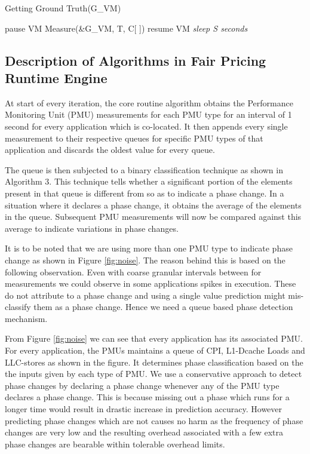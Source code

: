 \documentclass[pageno]{jpaper}
\begin{document}
\begin{algorithm}
\caption{Getting Ground Truth(G\_VM)}
\begin{algorithmic}[1]
\label{alg:groundtruth}
	\State	pause VM\;
	\EndIf
\EndFor
\EndFor
\State Measure(\&G\_VM, T, C[ ])\;
	\State	resume VM\;
	\EndIf
\EndFor
\EndFor
\textit{sleep S seconds}\;

\end{algorithmic}
\end{algorithm}
\subsection{Description of Algorithms in Fair Pricing Runtime Engine}
\label{subsec:DescriptionofAlgorithmsinFairPricingRuntimeEngine}

At start of every iteration, the core routine algorithm obtains the Performance Monitoring Unit (PMU) measurements for each PMU type for an interval of 1 second for every application which is co-located. It then appends every single measurement to their respective queues for specific PMU types of that application and discards the oldest value for every queue.

The queue is then subjected to a binary classification technique as shown in Algorithm 3. This technique tells whether a significant portion of the elements present in that queue is different from so as to indicate a phase change. In a situation where it declares a phase change, it obtains the average of the elements in the queue. Subsequent PMU measurements will now be compared against this average to indicate variations in phase changes.

It is to be noted that we are using more than one PMU type to indicate phase change as shown in Figure \ref{fig:noise}. The reason behind this is based on the following observation. Even with coarse granular intervals between for measurements we could observe in some applications spikes in execution. These do not attribute to a phase change and using a single value prediction might mis-classify them   as a phase change. Hence we need a queue based phase detection mechanism.

From Figure \ref{fig:noise} we can see that every application has its associated PMU. For every application, the PMUs maintains a queue of CPI, L1-Dcache Loads and LLC-stores as shown in the figure. It determines phase classification based on the the inputs given by each type of PMU. We use a conservative approach to detect phase changes by declaring a phase change whenever any of the PMU type declares a phase change. This is because missing out a phase which runs for a longer time would result in drastic increase in prediction accuracy. However predicting phase changes which are not causes no harm as the frequency of phase changes are very low and the resulting overhead associated with a few extra phase changes are bearable within tolerable overhead limits.
\end{document}
